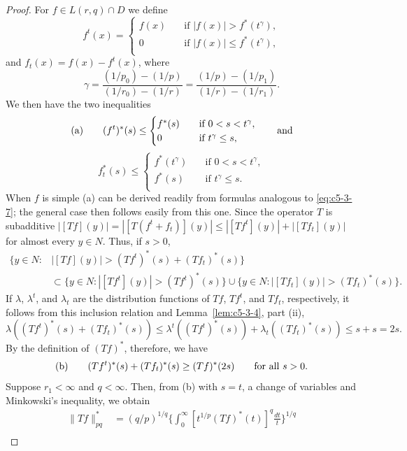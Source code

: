 \begin{proof}
For $f \in L(r, q) \cap D$ we define
\[
f^{t}(x)=\begin{cases}
f(x) & \quad\text{if } |f(x)| > f^{*}(t^{\gamma}),\\
0 & \quad\text{if } |f(x)| \leq f^{*}(t^{\gamma}),\\
\end{cases}
\]
and $f_{t}(x) = f(x) - f^{t}(x)$, where
\[
\gamma=\frac{(1/p_{0})-(1/p)}{(1/r_{0})-(1/r)}
=\frac{(1/p)-(1/p_{1})}{(1/r)-(1/r_{1})}.
\]
We then have the two inequalities
\[
\textup{(a)}\qquad
(f^{t})^{*}(s)\leq\begin{cases}
f^{*}(s) & \quad\text{if } 0 < s < t^{\gamma},\\
0 & \quad\text{if } t^{\gamma} \leq s,\\
\end{cases}
\qquad\text{and}
\]
\[
f_{t}^{*}(s)\leq\begin{cases}
f^{*}(t^{\gamma}) & \quad\text{if } 0 < s < t^{\gamma},\\
f^{*}(s) & \quad\text{if } t^{\gamma} \leq s.\\
\end{cases}
\]
When $f$ is simple (a) can be derived readily from formulas analogous to
\eqref{eq:c5-3-7}; the general case then follows easily from this one. Since the
operator $T$ is subadditive
$|[Tf](y)| = |[T(f^{t} + f_{t})](y)| \leq |[Tf^{t}](y)| + |[Tf_{t}](y)|$ for
almost every $y \in N$. Thus, if $s > 0$,
\begin{align*}
\{y \in N:{}&|[Tf](y)|>(Tf^{t})^{*}(s)+(Tf_{t})^{*}(s)\}\\
&\subset\{y \in N : |[Tf^{t}](y)|>(Tf^{t})^{*}(s)\}
\cup\{y \in N : |[Tf_{t}](y)|>(Tf_{t})^{*}(s)\}.
\end{align*}
If $\lambda$, $\lambda^{t}$, and $\lambda_{t}$ are the distribution functions of
$Tf$, $Tf^{t}$, and $Tf_{t}$, respectively, it follows from this inclusion
relation and Lemma~\ref{lem:c5-3-4}, part (ii),
\[
\lambda((Tf^{t})^{*}(s)+(Tf_{t})^{*}(s))\leq
\lambda^{t}((Tf^{t})^{*}(s))+\lambda_{t}((Tf_{t})^{*}(s))\leq s+s=2s.
\]
By the definition of $(Tf)^{*}$, therefore, we have
\[
\textup{(b)}\qquad
(Tf^{t})^{*}(s)+(Tf_{t})^{*}(s)\geq(Tf)^{*}(2s)\qquad\text{for all } s>0.
\]
Suppose $r_{1} < \infty$ and $q < \infty$. Then, from (b) with $s = t$, a
change of variables and Minkowski's inequality, we obtain
\begin{align*}
\|Tf\|_{pq}^{*}&=(q/p)^{1/q}\Biggl\{\int_{0}^{\infty}[t^{1/p}(Tf)^{*}(t)]^{q}\frac{dt}{t}\Biggr\}^{1/q}\\

\end{align*}
\end{proof}
